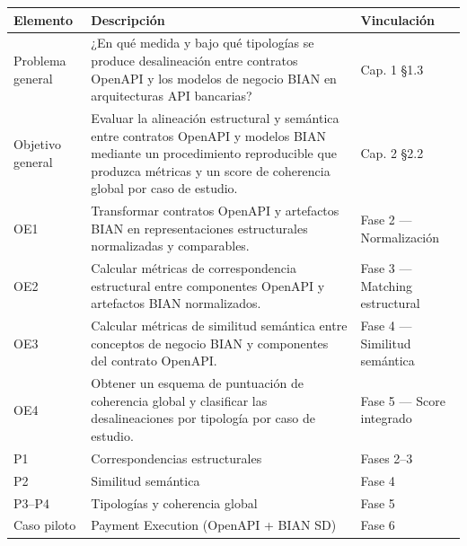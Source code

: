 \documentclass[10pt,landscape]{article}
\begin{document}
\begin{longtable}{@{}L{0.22\textwidth}L{0.52\textwidth}L{0.22\textwidth}@{}}
\toprule
\textbf{\color{white}Elemento} & \textbf{\color{white}Descripción} & \textbf{\color{white}Vinculación} \\
\midrule
\endhead
\bottomrule
\endfoot
\endlastfoot
Problema general & ¿En qué medida y bajo qué tipologías se produce desalineación entre contratos OpenAPI y los modelos de negocio BIAN en arquitecturas API bancarias? & Cap. 1 §1.3 \\
 Objetivo general & Evaluar la alineación estructural y semántica entre contratos OpenAPI y modelos BIAN mediante un procedimiento reproducible que produzca métricas y un score de coherencia global por caso de estudio. & Cap. 2 §2.2 \\
OE1 & Transformar contratos OpenAPI y artefactos BIAN en representaciones estructurales normalizadas y comparables. & Fase 2 — Normalización \\
 OE2 & Calcular métricas de correspondencia estructural entre componentes OpenAPI y artefactos BIAN normalizados. & Fase 3 — Matching estructural \\
OE3 & Calcular métricas de similitud semántica entre conceptos de negocio BIAN y componentes del contrato OpenAPI. & Fase 4 — Similitud semántica \\
 OE4 & Obtener un esquema de puntuación de coherencia global y clasificar las desalineaciones por tipología por caso de estudio. & Fase 5 — Score integrado \\
P1 & Correspondencias estructurales & Fases 2–3 \\
 P2 & Similitud semántica & Fase 4 \\
P3–P4 & Tipologías y coherencia global & Fase 5 \\
 Caso piloto & Payment Execution (OpenAPI + BIAN SD) & Fase 6 \\
\end{longtable}
\end{document}
